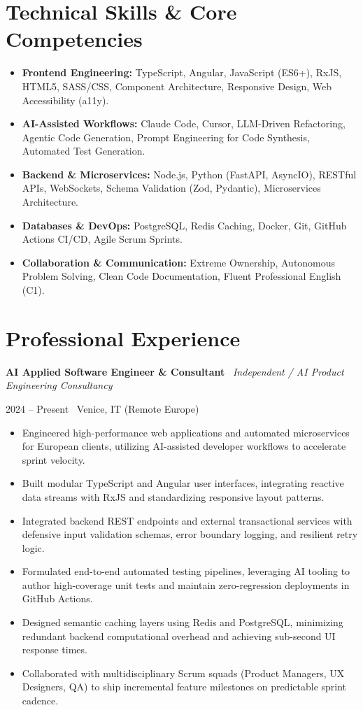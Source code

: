 \documentclass[a4paper,10pt]{article}
\newcommand{\role}[4]{%
  \vspace{2pt}\noindent
  \begin{minipage}[t]{0.70\textwidth}\raggedright\textbf{#1} \textbullet\ \textit{#3}\end{minipage}%
  \hfill
  \begin{minipage}[t]{0.28\textwidth}\raggedleft\footnotesize\color{gray}#2 \textbullet\ #4\end{minipage}%
  \vspace{1pt}%
}
\begin{document}
\section{Technical Skills \& Core Competencies}
\begin{itemize}[leftmargin=1.2em, itemsep=2pt]
  \item \textbf{Frontend Engineering:} TypeScript, Angular, JavaScript (ES6+), RxJS, HTML5, SASS/CSS, Component Architecture, Responsive Design, Web Accessibility (a11y).
  \item \textbf{AI-Assisted Workflows:} Claude Code, Cursor, LLM-Driven Refactoring, Agentic Code Generation, Prompt Engineering for Code Synthesis, Automated Test Generation.
  \item \textbf{Backend \& Microservices:} Node.js, Python (FastAPI, AsyncIO), RESTful APIs, WebSockets, Schema Validation (Zod, Pydantic), Microservices Architecture.
  \item \textbf{Databases \& DevOps:} PostgreSQL, Redis Caching, Docker, Git, GitHub Actions CI/CD, Agile Scrum Sprints.
  \item \textbf{Collaboration \& Communication:} Extreme Ownership, Autonomous Problem Solving, Clean Code Documentation, Fluent Professional English (C1).
\end{itemize}

\section{Professional Experience}

\role{AI Applied Software Engineer \& Consultant}{2024 -- Present}{Independent / AI Product Engineering Consultancy}{Venice, IT (Remote Europe)}
\begin{itemize}
  \item Engineered high-performance web applications and automated microservices for European clients, utilizing AI-assisted developer workflows to accelerate sprint velocity.
  \item Built modular TypeScript and Angular user interfaces, integrating reactive data streams with RxJS and standardizing responsive layout patterns.
  \item Integrated backend REST endpoints and external transactional services with defensive input validation schemas, error boundary logging, and resilient retry logic.
  \item Formulated end-to-end automated testing pipelines, leveraging AI tooling to author high-coverage unit tests and maintain zero-regression deployments in GitHub Actions.
  \item Designed semantic caching layers using Redis and PostgreSQL, minimizing redundant backend computational overhead and achieving sub-second UI response times.
  \item Collaborated with multidisciplinary Scrum squads (Product Managers, UX Designers, QA) to ship incremental feature milestones on predictable sprint cadence.
\end{itemize}
\end{document}
